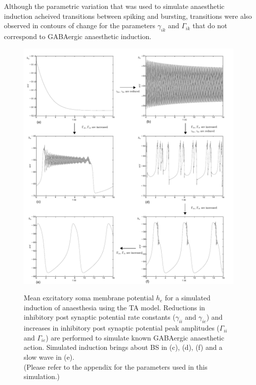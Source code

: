 \documentclass[a4paper,12pt]{article}
\begin{document}
Although the parametric variation that was used to simulate anaesthetic induction acheived transitions between spiking and bursting, transitions were also observed in contours of change for the parameters $\gamma_{ik}$ and $\Gamma_{ik}$ that do not correspond to GABAergic anaesthetic induction.

\begin{figure}
	\includegraphics[scale=0.75]{frontiers-2012-working-images/figure-1-thal.pdf}
	\label{fig:00143}
	\caption{Mean excitatory soma membrane potential $h_e$ for a simulated induction of anaesthesia using the TA model. 
Reductions in inhibitory post synaptic potential rate constants ($\gamma_{ii}$ and $\gamma_{ie}$) and increases in inhibitory post synaptic potential peak amplitudes ($\Gamma_{ii}$ and $\Gamma_{ie}$) are performed to simulate known GABAergic anaesthetic action. Simulated induction brings about BS in (c), (d), (f) and a slow wave in (e).
\\
(Please refer to the appendix for the parameters used in this simulation.)
}
\end{figure}
\end{document}
